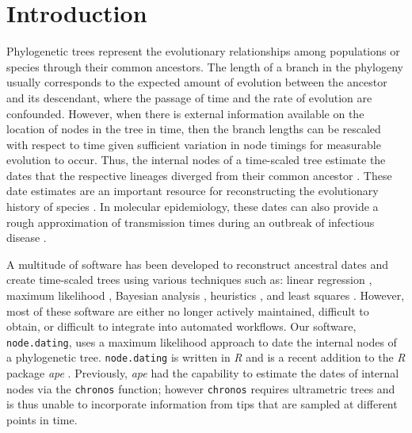 \documentclass{bioinfo}
\newcommand{\code}[1]{{\tt #1}}
\begin{document}
\section{Introduction} \label{sec:intro}
Phylogenetic trees represent the evolutionary relationships among populations or species through their common ancestors.  
The length of a branch in the phylogeny usually corresponds to the expected amount of evolution between the ancestor and its descendant, where the passage of time and the rate of evolution are confounded.
However, when there is external information available on the location of nodes in the tree in time, then the branch lengths can be rescaled with respect to time given sufficient variation in node timings for measurable evolution to occur.
Thus, the internal nodes of a time-scaled tree estimate the dates that the respective lineages diverged from their common ancestor \citep{Kumar16}.
These date estimates are an important resource for reconstructing the evolutionary history of species \citep{Shapiro04}.
In molecular epidemiology, these dates can also provide a rough approximation of transmission times during an outbreak of infectious disease \citep{Ypma13}.

A multitude of software has been developed to reconstruct ancestral dates and create time-scaled trees using various techniques such as: linear regression \citep{Tempest}, maximum likelihood \citep{TipDates, r8ts, PAML}, Bayesian analysis \citep{BEAST}, heuristics \citep{UPGMA, TREBLE}, and least squares \citep{LSD}.
However, most of these software are either no longer actively maintained, difficult to obtain, or difficult to integrate into automated workflows.
Our software, \code{node.dating}, uses a maximum likelihood approach to date the internal nodes of a phylogenetic tree.
\code{node.dating} is written in \emph{R} and is a recent addition to the \emph{R} package \emph{ape} \citep{APE}.
Previously, \emph{ape} had the capability to estimate the dates of internal nodes via the \code{chronos} function; however \code{chronos} requires ultrametric trees and is thus unable to incorporate information from tips that are sampled at different points in time.
\end{document}
